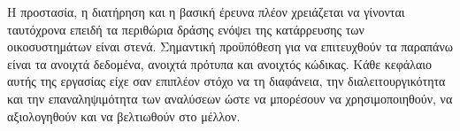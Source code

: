 \documentclass[11pt]{article}
\begin{document}
Η προστασία, η διατήρηση και η βασική έρευνα πλέον χρειάζεται να 
γίνονται ταυτόχρονα επειδή τα περιθώρια δράσης ενόψει της κατάρρευσης των
οικοσυστημάτων είναι στενά.
Σημαντική προϋπόθεση για να επιτευχθούν τα παραπάνω είναι τα ανοιχτά δεδομένα,
ανοιχτά πρότυπα και ανοιχτός κώδικας. Κάθε κεφάλαιο αυτής της εργασίας είχε σαν 
επιπλέον στόχο να τη διαφάνεια, την διαλειτουργικότητα και την επαναληψιμότητα 
των αναλύσεων ώστε να μπορέσουν να χρησιμοποιηθούν, να αξιολογηθούν και να βελτιωθούν στο μέλλον.
\end{document}
